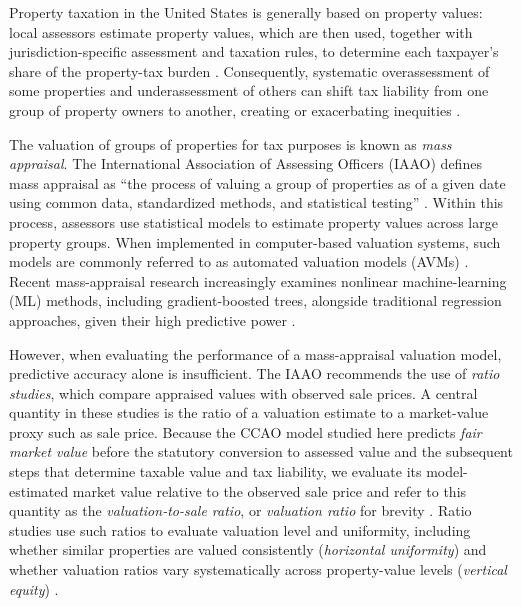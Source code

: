 \documentclass[10pt]{article}
\theoremstyle{definition}
\newcommand{\1}{\mathbf{1}}
\begin{document}
{Property taxation in the United States is generally based on property values}: local assessors estimate property values, which are then used, together with jurisdiction-specific assessment and taxation rules, to determine each taxpayer's share of the property-tax burden \cite{IAAO2020PropertyTaxPolicy,IAAO2025Mass}. Consequently, systematic overassessment of some properties and underassessment of others can shift tax liability from one group of property owners to another, creating or exacerbating inequities \cite{Berry2021,IAAO2020PropertyTaxPolicy}.

The {valuation} of groups of properties for tax purposes is known as \emph{mass appraisal}. The International Association of Assessing Officers (IAAO) defines mass appraisal as ``the process of valuing a group of properties as of a given date using common data, standardized methods, and statistical testing'' \cite{IAAO2025Mass}. Within this process, assessors use statistical models to estimate property values across large property groups. {When implemented in computer-based valuation systems, such models are commonly referred to as automated valuation models (AVMs)} \cite{IAAOAITaskForce2022,BidansetRakow2022}. Recent mass-appraisal research increasingly examines nonlinear machine-learning (ML) methods, including gradient-boosted trees, alongside traditional regression approaches, given their high predictive power \cite{Rootetal2023,Sevgen2024100111,Zilli2024}.

However, when evaluating the performance of a mass-appraisal valuation model, predictive accuracy alone is insufficient. The IAAO recommends the use of \emph{ratio studies}, which compare {appraised values} with observed sale prices.
{A central quantity in these studies is the ratio of a valuation estimate to a market-value proxy such as sale price. Because the CCAO model studied here predicts \emph{fair market value} before the statutory conversion to assessed value and the subsequent steps that determine taxable value and tax liability, we evaluate its model-estimated market value relative to the observed sale price and refer to this quantity as the \emph{valuation-to-sale ratio}, or \emph{valuation ratio} for brevity \cite{CCAOModelResAVM2026,CCAOAssessmentNotice2026,CCAOPropertyTaxSystem2026}.} Ratio studies use such ratios to evaluate valuation level and uniformity, including whether similar properties are valued consistently (\emph{horizontal uniformity}) and whether valuation ratios vary systematically across property-value levels (\emph{vertical equity}) \cite{IAAO2013Ratio,IAAO2025Mass,IAAO2026ExposureRatio}.
\end{document}
